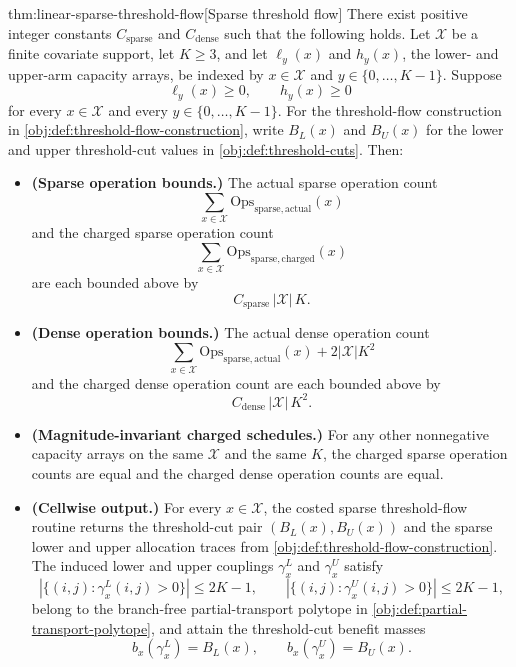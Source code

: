 \begin{theoremv}{thm:linear-sparse-threshold-flow}[Sparse threshold flow]
There exist positive integer constants \(C_{\mathrm{sparse}}\) and \(C_{\mathrm{dense}}\) such that the following holds.  Let \(\mathcal X\) be a finite covariate support, let \(K\ge 3\), and let \(\ell_y(x)\) and \(h_y(x)\), the lower- and upper-arm capacity arrays, be indexed by \(x\in\mathcal X\) and \(y\in\{0,\ldots,K-1\}\).  Suppose
\[
\ell_y(x)\ge 0,\qquad h_y(x)\ge 0
\]
for every \(x\in\mathcal X\) and every \(y\in\{0,\ldots,K-1\}\).  For the threshold-flow construction in \cref{obj:def:threshold-flow-construction}, write \(B_L(x)\) and \(B_U(x)\) for the lower and upper threshold-cut values in \cref{obj:def:threshold-cuts}.  Then:
\begin{itemize}
\item \textbf{(Sparse operation bounds.)} The actual sparse operation count
\[
\sum_{x\in\mathcal X}\mathrm{Ops}_{\mathrm{sparse,actual}}(x)
\]
and the charged sparse operation count
\[
\sum_{x\in\mathcal X}\mathrm{Ops}_{\mathrm{sparse,charged}}(x)
\]
are each bounded above by
\[
C_{\mathrm{sparse}}\,|\mathcal X|\,K .
\]

\item \textbf{(Dense operation bounds.)} The actual dense operation count
\[
\sum_{x\in\mathcal X}\mathrm{Ops}_{\mathrm{sparse,actual}}(x)+2|\mathcal X|K^2
\]
and the charged dense operation count are each bounded above by
\[
C_{\mathrm{dense}}\,|\mathcal X|\,K^2 .
\]

\item \textbf{(Magnitude-invariant charged schedules.)} For any other nonnegative capacity arrays on the same \(\mathcal X\) and the same \(K\), the charged sparse operation counts are equal and the charged dense operation counts are equal.

\item \textbf{(Cellwise output.)} For every \(x\in\mathcal X\), the costed sparse threshold-flow routine returns the threshold-cut pair \((B_L(x),B_U(x))\) and the sparse lower and upper allocation traces from \cref{obj:def:threshold-flow-construction}.  The induced lower and upper couplings \(\gamma_x^L\) and \(\gamma_x^U\) satisfy
\[
|\{(i,j):\gamma_x^L(i,j)>0\}|\le 2K-1,
\qquad
|\{(i,j):\gamma_x^U(i,j)>0\}|\le 2K-1,
\]
belong to the branch-free partial-transport polytope in \cref{obj:def:partial-transport-polytope}, and attain the threshold-cut benefit masses
\[
b_x(\gamma_x^L)=B_L(x),
\qquad
b_x(\gamma_x^U)=B_U(x).
\]
\end{itemize}
\end{theoremv}

